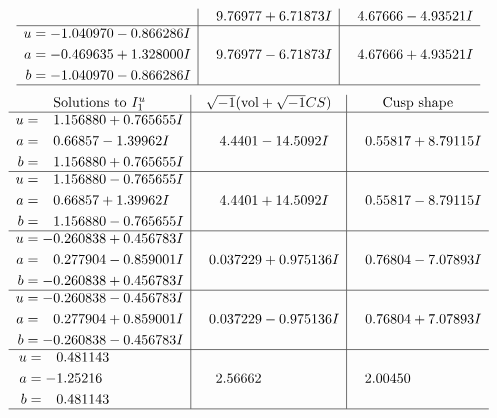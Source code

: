 \documentclass[1p]{elsarticle_modified}
\theoremstyle{definition}
\newcommand{\I}{\sqrt{-1}}
\begin{document}
$$\begin{array}{c|c|c}
 & \phantom{-}9.76977 + 6.71873 I & \phantom{-}4.67666 - 4.93521 I \\ \hline\begin{aligned}
u &= -1.040970 - 0.866286 I \\
a &= -0.469635 + 1.328000 I \\
b &= -1.040970 - 0.866286 I\end{aligned}
 & \phantom{-}9.76977 - 6.71873 I & \phantom{-}4.67666 + 4.93521 I\\
 \hline 
 \end{array}$$\newpage$$\begin{array}{c|c|c}  
\text{Solutions to }I^u_{1}& \I (\text{vol} + \sqrt{-1}CS) & \text{Cusp shape}\\
 \hline 
\begin{aligned}
u &= \phantom{-}1.156880 + 0.765655 I \\
a &= \phantom{-}0.66857 - 1.39962 I \\
b &= \phantom{-}1.156880 + 0.765655 I\end{aligned}
 & \phantom{-}4.4401 - 14.5092 I & \phantom{-}0.55817 + 8.79115 I \\ \hline\begin{aligned}
u &= \phantom{-}1.156880 - 0.765655 I \\
a &= \phantom{-}0.66857 + 1.39962 I \\
b &= \phantom{-}1.156880 - 0.765655 I\end{aligned}
 & \phantom{-}4.4401 + 14.5092 I & \phantom{-}0.55817 - 8.79115 I \\ \hline\begin{aligned}
u &= -0.260838 + 0.456783 I \\
a &= \phantom{-}0.277904 - 0.859001 I \\
b &= -0.260838 + 0.456783 I\end{aligned}
 & \phantom{-}0.037229 + 0.975136 I & \phantom{-}0.76804 - 7.07893 I \\ \hline\begin{aligned}
u &= -0.260838 - 0.456783 I \\
a &= \phantom{-}0.277904 + 0.859001 I \\
b &= -0.260838 - 0.456783 I\end{aligned}
 & \phantom{-}0.037229 - 0.975136 I & \phantom{-}0.76804 + 7.07893 I \\ \hline\begin{aligned}
u &= \phantom{-}0.481143\phantom{ +0.000000I} \\
a &= -1.25216\phantom{ +0.000000I} \\
b &= \phantom{-}0.481143\phantom{ +0.000000I}\end{aligned}
 & \phantom{-}2.56662\phantom{ +0.000000I} & \phantom{-}2.00450\phantom{ +0.000000I}\\
 \hline 
 \end{array}$$\newpage\newpage\renewcommand{\arraystretch}{1}
\end{document}
